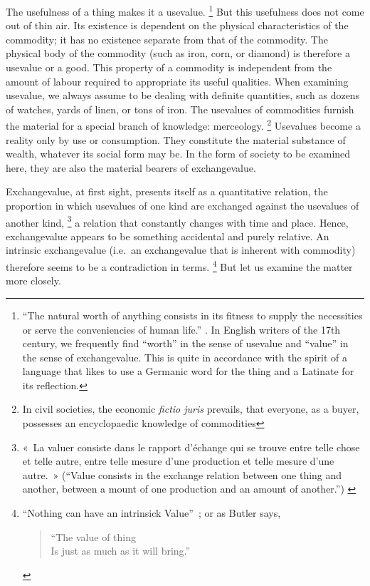The usefulness of a thing makes it a usevalue.%
\footnote{
    \enquote{The natural worth of anything consists 
    in its fitness to supply the necessities
    or serve the conveniencies of human life.}
    \citep[28]{fn04}. 
    In English writers of the 17th century,
    we frequently find \enquote{worth} in the sense of usevalue
    and \enquote{value} in the sense of exchangevalue. 
    This is quite in accordance with the spirit of a language 
    that likes to use a Germanic word for the thing
    and a Latinate for its reflection.
}
But this usefulness does not come out of thin air.
Its existence is dependent on the physical characteristics of the commodity;
it has no existence separate from that of the commodity.
The physical body of the commodity
(such as iron, corn, or diamond)
is therefore a usevalue or a good.
This property of a commodity 
is independent from the amount of labour
required to appropriate its useful qualities.
When examining usevalue,
we always assume to be dealing with definite quantities,
such as dozens of watches,
yards of linen,
or tons of iron.
The usevalues of commodities furnish the material 
for a special branch of knowledge:
merceology.%
\footnote{
    In civil societies,
    the economic \textit{fictio juris} prevails,
    that everyone, as a buyer, possesses an
    encyclopaedic knowledge of commodities
}
Usevalues become a reality only by use or consumption.
They constitute the material substance of wealth,
whatever its social form may be.
In the form of society to be examined here,
they are also the material bearers of exchangevalue.

Exchangevalue, at first sight, presents itself
as a quantitative relation,
the proportion in which usevalues of one kind
are exchanged against the usevalues of another kind,%
\footnote{
    «~La valuer consiste 
    dans le rapport d'échange 
    qui se trouve entre telle chose
    et telle autre,
    entre telle mesure d'une production
    et telle mesure d'une autre.~» 
    (\enquote{Value consists in the exchange relation between
        one thing and another,
        between a mount of one production and an amount of another.})
    \citep[889]{fn06}
}
a relation that constantly changes with time and place.
Hence, exchangevalue appears to be something accidental and purely relative.
An intrinsic exchangevalue 
(i.e.~an exchangevalue that is
inherent with commodity)
therefore seems to be a contradiction in terms.%
\footnote{
    \enquote{Nothing can have an intrinsick Value}~\citep[6]{fn02};
    or as Butler says, 
    \begin{verse}
        \enquote{The value of thing\\
        Is just as much as it will bring.}\\
    \end{verse}
    \citep{butlerhudibras}
}
But let us examine the matter more closely.

